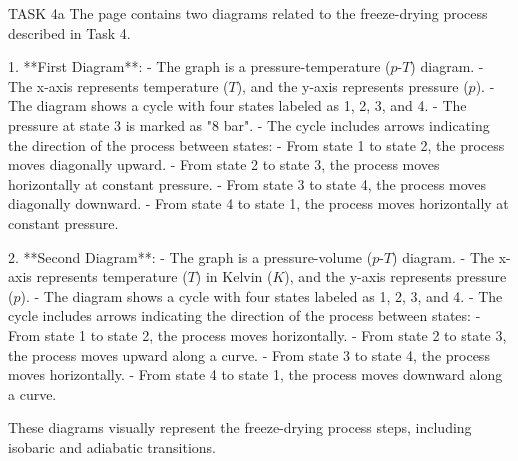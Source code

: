 TASK 4a  
The page contains two diagrams related to the freeze-drying process described in Task 4.

1. **First Diagram**:  
   - The graph is a pressure-temperature (\( p \)-\( T \)) diagram.  
   - The x-axis represents temperature (\( T \)), and the y-axis represents pressure (\( p \)).  
   - The diagram shows a cycle with four states labeled as 1, 2, 3, and 4.  
   - The pressure at state 3 is marked as "8 bar".  
   - The cycle includes arrows indicating the direction of the process between states:  
     - From state 1 to state 2, the process moves diagonally upward.  
     - From state 2 to state 3, the process moves horizontally at constant pressure.  
     - From state 3 to state 4, the process moves diagonally downward.  
     - From state 4 to state 1, the process moves horizontally at constant pressure.  

2. **Second Diagram**:  
   - The graph is a pressure-volume (\( p \)-\( T \)) diagram.  
   - The x-axis represents temperature (\( T \)) in Kelvin (\( K \)), and the y-axis represents pressure (\( p \)).  
   - The diagram shows a cycle with four states labeled as 1, 2, 3, and 4.  
   - The cycle includes arrows indicating the direction of the process between states:  
     - From state 1 to state 2, the process moves horizontally.  
     - From state 2 to state 3, the process moves upward along a curve.  
     - From state 3 to state 4, the process moves horizontally.  
     - From state 4 to state 1, the process moves downward along a curve.  

These diagrams visually represent the freeze-drying process steps, including isobaric and adiabatic transitions.